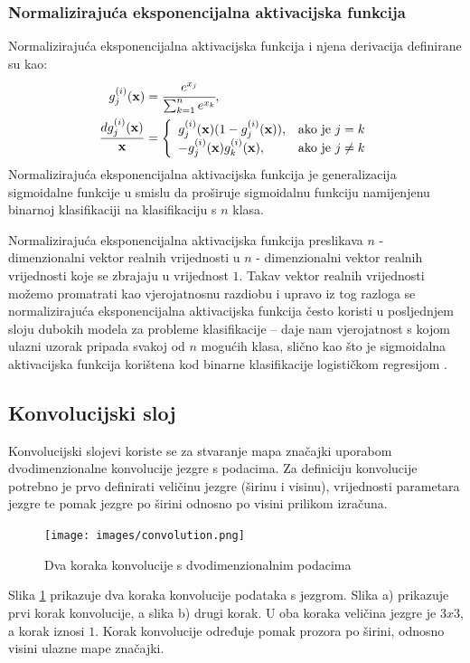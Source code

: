\documentclass[times, utf8, diplomski, numeric]{fer}
\begin{document}
\subsubsection{Normalizirajuća eksponencijalna aktivacijska funkcija}
Normalizirajuća eksponencijalna aktivacijska funkcija  i njena derivacija definirane su kao:
\begin{align}
 g^{(i)}_j(\mathbf{x})&=\cfrac{e^{x_j}}{\sum_{k=1}^{n} e^{x_k}}, \\
 \frac{dg^{(i)}_j(\mathbf{x})}{\mathbf{x}}&=\left\{
 \begin{array}{ll}
 g^{(i)}_j(\mathbf{x}) (1-g^{(i)}_j(\mathbf{x})),  & \mbox{ako je } j = k \\
 -g^{(i)}_j(\mathbf{x}) g^{(i)}_k(\mathbf{x}), & \mbox{ako je } j \neq k 
 \end{array}
 \right.
\end{align}
Normalizirajuća eksponencijalna aktivacijska funkcija je generalizacija sigmoidalne funkcije u smislu da proširuje sigmoidalnu funkciju namijenjenu binarnoj klasifikaciji na klasifikaciju s $n$ klasa.

Normalizirajuća eksponencijalna aktivacijska funkcija preslikava $n$ - dimenzionalni vektor realnih vrijednosti u $n$ - dimenzionalni vektor realnih vrijednosti koje se zbrajaju u vrijednost $1$.
Takav vektor realnih vrijednosti možemo promatrati kao vjerojatnosnu razdiobu i upravo iz tog razloga se normalizirajuća eksponencijalna aktivacijska funkcija često koristi u posljednjem sloju dubokih modela za probleme klasifikacije -- daje nam vjerojatnost s kojom ulazni uzorak pripada svakoj od $n$ mogućih klasa, slično kao što je sigmoidalna aktivacijska funkcija korištena kod binarne klasifikacije logističkom regresijom \citep{seminar:rela}.

\subsection{Konvolucijski sloj}
Konvolucijski slojevi koriste se za stvaranje mapa značajki uporabom dvodimenzionalne konvolucije jezgre s podacima.
Za definiciju konvolucije potrebno je prvo definirati veličinu jezgre (širinu i visinu), vrijednosti parametara jezgre te pomak jezgre po širini odnosno po visini prilikom izračuna.
\begin{figure}[H]
\centering
\texttt{[image: images/convolution.png]}
\caption{Dva koraka konvolucije s dvodimenzionalnim podacima}
\label{img:convolution}
\end{figure}
Slika \ref{img:convolution} prikazuje dva koraka konvolucije podataka s jezgrom. Slika a) prikazuje prvi korak konvolucije, a slika b) drugi korak. 
U oba koraka veličina jezgre je $3x3$, a korak iznosi $1$. 
Korak konvolucije  određuje pomak prozora po širini, odnosno visini ulazne mape značajki. 
\end{document}
